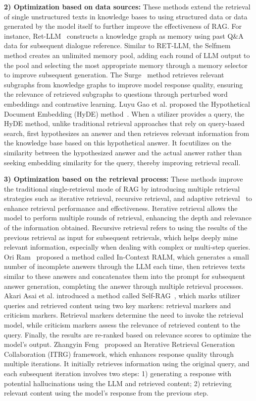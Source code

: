 \textbf{2) Optimization based on data sources:} These methods extend the retrieval of single unstructured texts in knowledge bases to using structured data or data generated by the model itself to further improve the effectiveness of RAG. For instance, Ret-LLM~\cite{modarressi2023ret} constructs a knowledge graph as memory using past Q\&A data for subsequent dialogue reference. Similar to RET-LLM, the Selfmem method creates an unlimited memory pool, adding each round of LLM output to the pool and selecting the most appropriate memory through a memory selector to improve subsequent generation. The Surge~\cite{kang2023knowledge} method retrieves relevant subgraphs from knowledge graphs to improve model response quality, ensuring the relevance of retrieved subgraphs to questions through perturbed word embeddings and contrastive learning. Luyu Gao et al. proposed the Hypothetical Document Embedding (HyDE) method~\cite{gao2022precise}. When a utilizer provides a query, the HyDE method, unlike traditional retrieval approaches that rely on query-based search, first hypothesizes an answer and then retrieves relevant information from the knowledge base based on this hypothetical answer. It focutilizes on the similarity between the hypothesized answer and the actual answer rather than seeking embedding similarity for the query, thereby improving retrieval recall.

\textbf{3) Optimization based on the retrieval process:} These methods improve the traditional single-retrieval mode of RAG by introducing multiple retrieval strategies such as iterative retrieval, recursive retrieval, and adaptive retrieval~\cite{jiang2023active} to enhance retrieval performance and effectiveness. Iterative retrieval allows the model to perform multiple rounds of retrieval, enhancing the depth and relevance of the information obtained. Recursive retrieval refers to using the results of the previous retrieval as input for subsequent retrievals, which helps deeply mine relevant information, especially when dealing with complex or multi-step queries. Ori Ram~\cite{ram2023context} proposed a method called In-Context RALM, which generates a small number of incomplete answers through the LLM each time, then retrieves texts similar to these answers and concatenates them into the prompt for subsequent answer generation, completing the answer through multiple retrieval processes. Akari Asai et al. introduced a method called Self-RAG~\cite{asai2023self}, which marks utilizer queries and retrieved content using two key markers: retrieval markers and criticism markers. Retrieval markers determine the need to invoke the retrieval model, while criticism markers assess the relevance of retrieved content to the query. Finally, the results are re-ranked based on relevance scores to optimize the model's output. Zhangyin Feng~\cite{feng2024retrieval} proposed an Iterative Retrieval Generation Collaboration (ITRG) framework, which enhances response quality through multiple iterations. It initially retrieves information using the original query, and each subsequent iteration involves two steps: 1) generating a response with potential hallucinations using the LLM and retrieved content; 2) retrieving relevant content using the model's response from the previous step.

